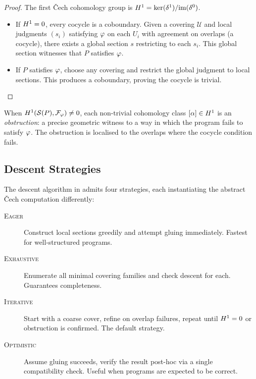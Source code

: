 \begin{proof}
The first \v{C}ech cohomology group is
$H^{1} = \ker(\delta^1)/\mathrm{im}(\delta^0)$.
\begin{itemize}
  \item[($\Leftarrow$)] If $H^{1} = 0$, every cocycle is a coboundary.
    Given a covering $\mathcal{U}$ and local judgments $(s_i)$ satisfying
    $\varphi$ on each $U_i$ with agreement on overlaps (a cocycle), there
    exists a global section $s$ restricting to each $s_i$.  This global
    section witnesses that $P$ satisfies $\varphi$.
  \item[($\Rightarrow$)] If $P$ satisfies $\varphi$, choose any covering and
    restrict the global judgment to local sections.  This produces a
    coboundary, proving the cocycle is trivial.
\end{itemize}
\end{proof}

\begin{corollary}\label{cor:obstruction}
When $H^{1}(\mathcal{S}(P), \mathcal{F}_\varphi) \neq 0$, each non-trivial
cohomology class $[\alpha] \in H^{1}$ is an \emph{obstruction}:
a precise geometric witness to a way in which the program fails to satisfy
$\varphi$.  The obstruction is localised to the overlaps where the cocycle
condition fails.
\end{corollary}

\subsection{Descent Strategies}\label{subsec:strategies}

The descent algorithm in \JuGeo{} admits four strategies, each instantiating
the abstract \v{C}ech computation differently:

\begin{description}
  \item[\textsc{Eager}] Construct local sections greedily and attempt
    gluing immediately.  Fastest for well-structured programs.
  \item[\textsc{Exhaustive}] Enumerate all minimal covering families
    and check descent for each.  Guarantees completeness.
  \item[\textsc{Iterative}] Start with a coarse cover, refine on overlap
    failures, repeat until $H^{1} = 0$ or obstruction is confirmed.
    The default strategy.
  \item[\textsc{Optimistic}] Assume gluing succeeds, verify the result
    post-hoc via a single compatibility check.  Useful when programs are
    expected to be correct.
\end{description}


